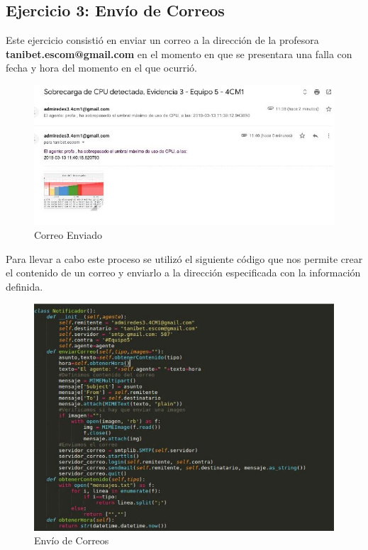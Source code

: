 \subsection{Ejercicio 3: Envío de Correos}
\noindent
Este ejercicio consistió en enviar un correo a la dirección de la profesora \textbf{tanibet.escom@gmail.com} en el momento en que se presentara una falla con fecha y hora del momento en el que ocurrió.
\begin{figure}[H]
  \centering
    \includegraphics[scale=1.1]{imagenes/primero/4.JPG}
    \caption{Correo Enviado}
\end{figure}
\noindent
Para llevar a cabo este proceso se utilizó el siguiente código que nos permite crear el contenido de un correo y enviarlo a la dirección especificada con la información definida.
\begin{figure}[H]
  \centering
    \includegraphics[scale=.8]{imagenes/primero/5.JPG}
    \caption{Envío de Correos}
\end{figure}
